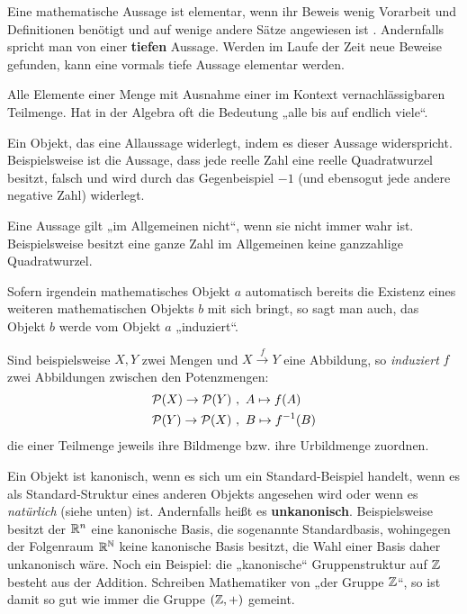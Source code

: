 \begin{description}[labelindent=0pt, leftmargin=0pt]
    \item[Elementar:] Eine mathematische Aussage ist elementar, wenn ihr Beweis wenig Vorarbeit und Definitionen benötigt und auf wenige andere Sätze angewiesen ist . Andernfalls spricht man von einer \textbf{tiefen} Aussage. Werden im Laufe der Zeit neue Beweise gefunden, kann eine vormals tiefe Aussage elementar werden.

    \item[Fast alle:] Alle Elemente einer Menge mit Ausnahme einer im Kontext vernachlässigbaren Teilmenge. Hat in der Algebra oft die Bedeutung „alle bis auf endlich viele“.

    \item[Gegenbeispiel:] Ein Objekt, das eine Allaussage widerlegt, indem es dieser Aussage widerspricht. Beispielsweise ist die Aussage, dass jede reelle Zahl eine reelle Quadratwurzel besitzt, falsch und wird durch das Gegenbeispiel $-1$ (und ebensogut jede andere negative Zahl) widerlegt.

    \item[Im Allgemeinen nicht:] Eine Aussage gilt „im Allgemeinen nicht“, wenn sie nicht immer wahr ist. Beispielsweise besitzt eine ganze Zahl im Allgemeinen keine ganzzahlige Quadratwurzel.
    
    \item[Induzieren:] Sofern irgendein mathematisches Objekt $a$ automatisch bereits die Existenz eines weiteren mathematischen Objekts $b$ mit sich bringt, so sagt man auch, das Objekt $b$ werde vom Objekt $a$ „induziert“.

    Sind beispielsweise $X,Y$ zwei Mengen und $X\xrightarrow{f} Y$ eine Abbildung, so \emph{induziert} $f$ zwei Abbildungen zwischen den Potenzmengen:
    \begin{align*}
        \mathcal P(X) \to \mathcal P(Y) \ & , \ A\mapsto f(A) \\
            \mathcal P(Y) \to \mathcal P(X) \ & , \ B\mapsto f^{-1}(B)
    \end{align*}
    die einer Teilmenge jeweils ihre Bildmenge bzw. ihre Urbildmenge zuordnen.
    
    \item[Kanonisch:] Ein Objekt ist kanonisch, wenn es sich um ein Standard-Beispiel handelt, wenn es als Standard-Struktur eines anderen Objekts angesehen wird oder wenn es \emph{natürlich} (siehe unten) ist. Andernfalls heißt es \textbf{unkanonisch}. Beispielsweise besitzt der $\mathbb R^n$ eine kanonische Basis, die sogenannte Standardbasis, wohingegen der Folgenraum $\mathbb R^\mathbb N$ keine kanonische Basis besitzt, die Wahl einer Basis daher unkanonisch wäre. Noch ein Beispiel: die „kanonische“ Gruppenstruktur auf $\mathbb Z$ besteht aus der Addition. Schreiben Mathematiker von „der Gruppe $\mathbb Z$“, so ist damit so gut wie immer die Gruppe $(\mathbb Z,+)$ gemeint.


\end{description}
